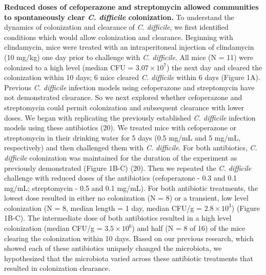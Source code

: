 \documentclass[11pt,]{article}
\begin{document}
\textbf{Reduced doses of cefoperazone and streptomycin allowed
communities to spontaneously clear \emph{C. difficile} colonization.} To
understand the dynamics of colonization and clearance of \emph{C.
difficile}, we first identified conditions which would allow
colonization and clearance. Beginning with clindamycin, mice were
treated with an intraperitoneal injection of clindamycin (10 mg/kg) one
day prior to challenge with \emph{C. difficile}. All mice (N = 11) were
colonized to a high level (median CFU = \(3.07 \times 10^7\)) the next
day and cleared the colonization within 10 days; 6 mice cleared \emph{C.
difficile} within 6 days (Figure 1A). Previous \emph{C. difficile}
infection models using cefoperazone and streptomycin have not
demonstrated clearance. So we next explored whether cefoperazone and
streptomycin could permit colonization and subsequent clearance with
lower doses. We began with replicating the previously established
\emph{C. difficile} infection models using these antibiotics (20). We
treated mice with cefoperazone or streptomycin in their drinking water
for 5 days (0.5 mg/mL and 5 mg/mL, respectively) and then challenged
them with \emph{C. difficile}. For both antibiotics, \emph{C. difficile}
colonization was maintained for the duration of the experiment as
previously demonstrated (Figure 1B-C) (20). Then we repeated the
\emph{C. difficile} challenge with reduced doses of the antibiotics
(cefoperazone - 0.3 and 0.1 mg/mL; streptomycin - 0.5 and 0.1 mg/mL).
For both antibiotic treatments, the lowest dose resulted in either no
colonization (N = 8) or a transient, low level colonization (N = 8,
median length = 1 day, median CFU/g = \(2.8 \times 10^3\)) (Figure
1B-C). The intermediate dose of both antibiotics resulted in a high
level colonization (median CFU/g = \(3.5 \times 10^6\)) and half (N = 8
of 16) of the mice clearing the colonization within 10 days. Based on
our previous research, which showed each of these antibiotics uniquely
changed the microbiota, we hypothesized that the microbiota varied
across these antibiotic treatments that resulted in colonization
clearance.
\end{document}
